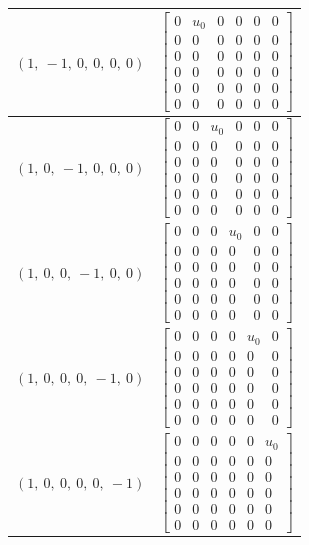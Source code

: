\documentclass[11pt]{article}
\theoremstyle{definition}
\begin{document}
\begin{longtable}{|l|c|}
    \hline
    $\left( 1, \  -1, \  0, \  0, \  0, \  0\right)$ & ${\left[\begin{matrix}0 & u_{0} & 0 & 0 & 0 & 0\\0 & 0 & 0 & 0 & 0 & 0\\0 & 0 & 0 & 0 & 0 & 0\\0 & 0 & 0 & 0 & 0 & 0\\0 & 0 & 0 & 0 & 0 & 0\\0 & 0 & 0 & 0 & 0 & 0\end{matrix}\right]}$ \\
    \hline
    $\left( 1, \  0, \  -1, \  0, \  0, \  0\right)$ & ${\left[\begin{matrix}0 & 0 & u_{0} & 0 & 0 & 0\\0 & 0 & 0 & 0 & 0 & 0\\0 & 0 & 0 & 0 & 0 & 0\\0 & 0 & 0 & 0 & 0 & 0\\0 & 0 & 0 & 0 & 0 & 0\\0 & 0 & 0 & 0 & 0 & 0\end{matrix}\right]}$ \\
    \hline
    $\left( 1, \  0, \  0, \  -1, \  0, \  0\right)$ & ${\left[\begin{matrix}0 & 0 & 0 & u_{0} & 0 & 0\\0 & 0 & 0 & 0 & 0 & 0\\0 & 0 & 0 & 0 & 0 & 0\\0 & 0 & 0 & 0 & 0 & 0\\0 & 0 & 0 & 0 & 0 & 0\\0 & 0 & 0 & 0 & 0 & 0\end{matrix}\right]}$ \\
    \hline
    $\left( 1, \  0, \  0, \  0, \  -1, \  0\right)$ & ${\left[\begin{matrix}0 & 0 & 0 & 0 & u_{0} & 0\\0 & 0 & 0 & 0 & 0 & 0\\0 & 0 & 0 & 0 & 0 & 0\\0 & 0 & 0 & 0 & 0 & 0\\0 & 0 & 0 & 0 & 0 & 0\\0 & 0 & 0 & 0 & 0 & 0\end{matrix}\right]}$ \\
    \hline
    $\left( 1, \  0, \  0, \  0, \  0, \  -1\right)$ & ${\left[\begin{matrix}0 & 0 & 0 & 0 & 0 & u_{0}\\0 & 0 & 0 & 0 & 0 & 0\\0 & 0 & 0 & 0 & 0 & 0\\0 & 0 & 0 & 0 & 0 & 0\\0 & 0 & 0 & 0 & 0 & 0\\0 & 0 & 0 & 0 & 0 & 0\end{matrix}\right]}$ \\
    \hline
\end{longtable}
\end{document}

